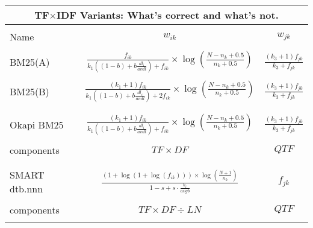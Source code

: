 \begin{table}
  \centering
  \small
  \begin{minipage}[t]{0.65\textwidth}
    
    \begin{tabular}{lcc}
      \multicolumn{3}{c}{TF$\times$IDF Variants: What's correct and what's not.}\\
      \hline\hline
      \\
      Name & $w_{ik}$ & $w_{jk}$\\
      \hline
      \\
      BM25(A)
      & $\frac{f_{ik}}{k_{1}((1-b)+b\frac{dl_{i}}{avdl})+f_{ik}} \times \log(\frac{N-n_{k}+0.5}{n_{k}+0.5})$
      & $\frac{(k_{3}+1)f_{jk}}{k_{3}+f_{jk}}$ \\
      \\
      BM25(B)
      & $\frac{(k_{1}+1)f_{ik}}{k_{1}((1-b)+b\frac{dl_{i}}{avdl})+2f_{ik}} \times \log(\frac{N-n_{k}+0.5}{n_{k}+0.5})$
      & $\frac{(k_{3}+1)f_{jk}}{k_{3}+f_{jk}}$ \\
      \\\hline
      \\
      Okapi BM25
      & $\frac{(k_{1}+1)f_{ik}}{k_{1}((1-b)+b\frac{dl_{i}}{avdl})+f_{ik}} \times \log(\frac{N-n_{k}+0.5}{n_{k}+0.5})$
      & $\frac{(k_{3}+1)f_{jk}}{k_{3}+f_{jk}}$ \\
      \\
      components & $TF \times DF$ & $QTF$ \\
      \\\hline
      \\
      SMART dtb.nnn
      & $\frac{(1+\log(1+\log(f_{ik}))) \times \log(\frac{N+1}{n_{k}})}{1-s+s \cdot \frac{b_{i}}{avgb}}$
      & $f_{jk}$ \\
      \\
      components & $TF \times DF \div LN$ & $QTF$ \\
      \\\hline\hline

    \end{tabular}
    

\end{minipage}
\end{table}
